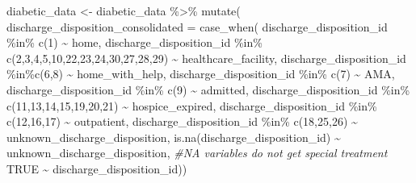 \documentclass[
]{article}
\newenvironment{Shaded}{\begin{snugshade}}{\end{snugshade}}
\newcommand{\AttributeTok}[1]{\textcolor[rgb]{0.77,0.63,0.00}{#1}}
\newcommand{\CommentTok}[1]{\textcolor[rgb]{0.56,0.35,0.01}{\textit{#1}}}
\newcommand{\ConstantTok}[1]{\textcolor[rgb]{0.00,0.00,0.00}{#1}}
\newcommand{\DecValTok}[1]{\textcolor[rgb]{0.00,0.00,0.81}{#1}}
\newcommand{\FunctionTok}[1]{\textcolor[rgb]{0.00,0.00,0.00}{#1}}
\newcommand{\NormalTok}[1]{#1}
\newcommand{\OtherTok}[1]{\textcolor[rgb]{0.56,0.35,0.01}{#1}}
\newcommand{\SpecialCharTok}[1]{\textcolor[rgb]{0.00,0.00,0.00}{#1}}
\newcommand{\StringTok}[1]{\textcolor[rgb]{0.31,0.60,0.02}{#1}}
\begin{document}
\begin{Shaded}
\begin{Highlighting}[]
\NormalTok{diabetic\_data }\OtherTok{\textless{}{-}}\NormalTok{ diabetic\_data }\SpecialCharTok{\%\textgreater{}\%}
  \FunctionTok{mutate}\NormalTok{(}
    \AttributeTok{discharge\_disposition\_consolidated =} \FunctionTok{case\_when}\NormalTok{(}
\NormalTok{      discharge\_disposition\_id }\SpecialCharTok{\%in\%} \FunctionTok{c}\NormalTok{(}\DecValTok{1}\NormalTok{) }\SpecialCharTok{\textasciitilde{}} \StringTok{\textquotesingle{}home\textquotesingle{}}\NormalTok{,}
\NormalTok{      discharge\_disposition\_id }\SpecialCharTok{\%in\%} \FunctionTok{c}\NormalTok{(}\DecValTok{2}\NormalTok{,}\DecValTok{3}\NormalTok{,}\DecValTok{4}\NormalTok{,}\DecValTok{5}\NormalTok{,}\DecValTok{10}\NormalTok{,}\DecValTok{22}\NormalTok{,}\DecValTok{23}\NormalTok{,}\DecValTok{24}\NormalTok{,}\DecValTok{30}\NormalTok{,}\DecValTok{27}\NormalTok{,}\DecValTok{28}\NormalTok{,}\DecValTok{29}\NormalTok{) }\SpecialCharTok{\textasciitilde{}} \StringTok{\textquotesingle{}healthcare\_facility\textquotesingle{}}\NormalTok{,}
\NormalTok{      discharge\_disposition\_id }\SpecialCharTok{\%in\%}\FunctionTok{c}\NormalTok{(}\DecValTok{6}\NormalTok{,}\DecValTok{8}\NormalTok{) }\SpecialCharTok{\textasciitilde{}} \StringTok{\textquotesingle{}home\_with\_help\textquotesingle{}}\NormalTok{,}
\NormalTok{      discharge\_disposition\_id }\SpecialCharTok{\%in\%} \FunctionTok{c}\NormalTok{(}\DecValTok{7}\NormalTok{) }\SpecialCharTok{\textasciitilde{}} \StringTok{\textquotesingle{}AMA\textquotesingle{}}\NormalTok{,}
\NormalTok{      discharge\_disposition\_id }\SpecialCharTok{\%in\%} \FunctionTok{c}\NormalTok{(}\DecValTok{9}\NormalTok{) }\SpecialCharTok{\textasciitilde{}} \StringTok{\textquotesingle{}admitted\textquotesingle{}}\NormalTok{,}
\NormalTok{      discharge\_disposition\_id }\SpecialCharTok{\%in\%} \FunctionTok{c}\NormalTok{(}\DecValTok{11}\NormalTok{,}\DecValTok{13}\NormalTok{,}\DecValTok{14}\NormalTok{,}\DecValTok{15}\NormalTok{,}\DecValTok{19}\NormalTok{,}\DecValTok{20}\NormalTok{,}\DecValTok{21}\NormalTok{) }\SpecialCharTok{\textasciitilde{}} \StringTok{\textquotesingle{}hospice\_expired\textquotesingle{}}\NormalTok{,}
\NormalTok{      discharge\_disposition\_id }\SpecialCharTok{\%in\%} \FunctionTok{c}\NormalTok{(}\DecValTok{12}\NormalTok{,}\DecValTok{16}\NormalTok{,}\DecValTok{17}\NormalTok{) }\SpecialCharTok{\textasciitilde{}} \StringTok{\textquotesingle{}outpatient\textquotesingle{}}\NormalTok{,}
\NormalTok{      discharge\_disposition\_id }\SpecialCharTok{\%in\%} \FunctionTok{c}\NormalTok{(}\DecValTok{18}\NormalTok{,}\DecValTok{25}\NormalTok{,}\DecValTok{26}\NormalTok{) }\SpecialCharTok{\textasciitilde{}} \StringTok{\textquotesingle{}unknown\_discharge\_disposition\textquotesingle{}}\NormalTok{,}
      \FunctionTok{is.na}\NormalTok{(discharge\_disposition\_id) }\SpecialCharTok{\textasciitilde{}} \StringTok{\textquotesingle{}unknown\_discharge\_disposition\textquotesingle{}}\NormalTok{, }\CommentTok{\#NA variables do not get special treatment}
      \ConstantTok{TRUE} \SpecialCharTok{\textasciitilde{}}\NormalTok{ discharge\_disposition\_id))}
\end{Highlighting}
\end{Shaded}
\end{document}
